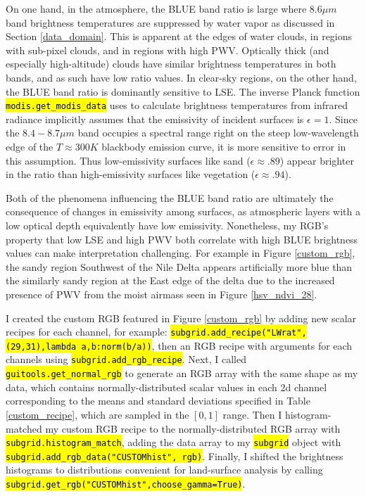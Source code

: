 \documentclass[12pt]{article}
\newcommand{\hltexttt}[1]{\texttt{\hl{#1}}}
\begin{document}
On one hand, in the atmosphere, the BLUE band ratio is large where $8.6\mu m$ band brightness temperatures are suppressed by water vapor as discussed in Section \ref{data_domain}. This is apparent at the edges of water clouds, in regions with sub-pixel clouds, and in regions with high PWV. Optically thick (and especially high-altitude) clouds have similar brightness temperatures in both bands, and as such have low ratio values. In clear-sky regions, on the other hand, the BLUE band ratio is dominantly sensitive to LSE. The inverse Planck function \hltexttt{modis.get\_modis\_data} uses to calculate brightness temperatures from infrared radiance implicitly assumes that the emissivity of incident surfaces is $\epsilon = 1$. Since the $8.4-8.7\mu m$ band occupies a spectral range right on the steep low-wavelength edge of the $T\approx 300K$ blackbody emission curve, it is more sensitive to error in this assumption. Thus low-emissivity surfaces like sand ($\epsilon \approx .89$) appear brighter in the ratio than high-emissivity surfaces like vegetation ($\epsilon \approx .94$).

Both of the phenomena influencing the BLUE band ratio are ultimately the consequence of changes in emissivity among surfaces, as atmospheric layers with a low optical depth equivalently have low emissivity. Nonetheless, my RGB's property that low LSE and high PWV both correlate with high BLUE brightness values can make interpretation challenging. For example in Figure \ref{custom_rgb}, the sandy region Southwest of the Nile Delta appears artificially more blue than the similarly sandy region at the East edge of the delta due to the increased presence of PWV from the moist airmass seen in Figure \ref{hsv_ndvi_28}.

I created the custom RGB featured in Figure \ref{custom_rgb} by adding new scalar recipes for each channel, for example: \hltexttt{subgrid.add\_recipe("LWrat",(29,31),lambda a,b:norm(b/a))}, then an RGB recipe with arguments for each channels using \hltexttt{subgrid.add\_rgb\_recipe}. Next, I called \hltexttt{guitools.get\_normal\_rgb} to generate an RGB array with the same shape as my data, which contains normally-distributed scalar values in each 2d channel corresponding to the means and standard deviations specified in Table \ref{custom_recipe}, which are sampled in the $[0,1]$ range. Then I histogram-matched my custom RGB recipe to the normally-distributed RGB array with \hltexttt{subgrid.histogram\_match}, adding the data array to my \hltexttt{subgrid} object with \hltexttt{subgrid.add\_rgb\_data("CUSTOMhist", rgb)}. Finally, I shifted the brightness histograms to distributions convenient for land-surface analysis by calling \hltexttt{subgrid.get\_rgb("CUSTOMhist",choose\_gamma=True)}.
\end{document}
